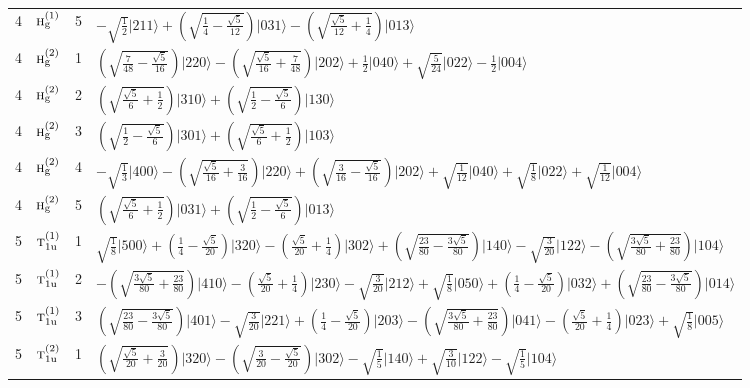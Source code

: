 \documentclass[11pt]{article}
\newcommand{\irr}[1]{\text{\normalfont\scshape #1}}
\newcommand{\ptag}[1]{\mathrm{#1}}
\newcommand{\occ}[1]{\lvert #1\rangle}
\begin{document}
\begin{longtable}{c l c p{}}
4 & $\irr{h}_{\ptag{g}}^{(1)}$ & 5 & $-\sqrt{\tfrac{1}{2}}\occ{211}+(\sqrt{\frac{1}{4} - \frac{\sqrt{5}}{12}})\occ{031}-(\sqrt{\frac{\sqrt{5}}{12} + \frac{1}{4}})\occ{013}$\\
4 & $\irr{h}_{\ptag{g}}^{(2)}$ & 1 & $(\sqrt{\frac{7}{48} - \frac{\sqrt{5}}{16}})\occ{220}-(\sqrt{\frac{\sqrt{5}}{16} + \frac{7}{48}})\occ{202}+\tfrac{1}{2}\occ{040}+\sqrt{\tfrac{5}{24}}\occ{022}-\tfrac{1}{2}\occ{004}$\\
4 & $\irr{h}_{\ptag{g}}^{(2)}$ & 2 & $(\sqrt{\frac{\sqrt{5}}{6} + \frac{1}{2}})\occ{310}+(\sqrt{\frac{1}{2} - \frac{\sqrt{5}}{6}})\occ{130}$\\
4 & $\irr{h}_{\ptag{g}}^{(2)}$ & 3 & $(\sqrt{\frac{1}{2} - \frac{\sqrt{5}}{6}})\occ{301}+(\sqrt{\frac{\sqrt{5}}{6} + \frac{1}{2}})\occ{103}$\\
4 & $\irr{h}_{\ptag{g}}^{(2)}$ & 4 & $-\sqrt{\tfrac{1}{3}}\occ{400}-(\sqrt{\frac{\sqrt{5}}{16} + \frac{3}{16}})\occ{220}+(\sqrt{\frac{3}{16} - \frac{\sqrt{5}}{16}})\occ{202}+\sqrt{\tfrac{1}{12}}\occ{040}+\sqrt{\tfrac{1}{8}}\occ{022}+\sqrt{\tfrac{1}{12}}\occ{004}$\\
4 & $\irr{h}_{\ptag{g}}^{(2)}$ & 5 & $(\sqrt{\frac{\sqrt{5}}{6} + \frac{1}{2}})\occ{031}+(\sqrt{\frac{1}{2} - \frac{\sqrt{5}}{6}})\occ{013}$\\
\hline
5 & $\irr{t}_{1\ptag{u}}^{(1)}$ & 1 & $\sqrt{\tfrac{1}{8}}\occ{500}+(\frac{1}{4} - \frac{\sqrt{5}}{20})\occ{320}-(\frac{\sqrt{5}}{20} + \frac{1}{4})\occ{302}+(\sqrt{\frac{23}{80} - \frac{3 \sqrt{5}}{80}})\occ{140}-\sqrt{\tfrac{3}{20}}\occ{122}-(\sqrt{\frac{3 \sqrt{5}}{80} + \frac{23}{80}})\occ{104}$\\
5 & $\irr{t}_{1\ptag{u}}^{(1)}$ & 2 & $-(\sqrt{\frac{3 \sqrt{5}}{80} + \frac{23}{80}})\occ{410}-(\frac{\sqrt{5}}{20} + \frac{1}{4})\occ{230}-\sqrt{\tfrac{3}{20}}\occ{212}+\sqrt{\tfrac{1}{8}}\occ{050}+(\frac{1}{4} - \frac{\sqrt{5}}{20})\occ{032}+(\sqrt{\frac{23}{80} - \frac{3 \sqrt{5}}{80}})\occ{014}$\\
5 & $\irr{t}_{1\ptag{u}}^{(1)}$ & 3 & $(\sqrt{\frac{23}{80} - \frac{3 \sqrt{5}}{80}})\occ{401}-\sqrt{\tfrac{3}{20}}\occ{221}+(\frac{1}{4} - \frac{\sqrt{5}}{20})\occ{203}-(\sqrt{\frac{3 \sqrt{5}}{80} + \frac{23}{80}})\occ{041}-(\frac{\sqrt{5}}{20} + \frac{1}{4})\occ{023}+\sqrt{\tfrac{1}{8}}\occ{005}$\\
5 & $\irr{t}_{1\ptag{u}}^{(2)}$ & 1 & $(\sqrt{\frac{\sqrt{5}}{20} + \frac{3}{20}})\occ{320}-(\sqrt{\frac{3}{20} - \frac{\sqrt{5}}{20}})\occ{302}-\sqrt{\tfrac{1}{5}}\occ{140}+\sqrt{\tfrac{3}{10}}\occ{122}-\sqrt{\tfrac{1}{5}}\occ{104}$\\

\end{longtable}
\end{document}
